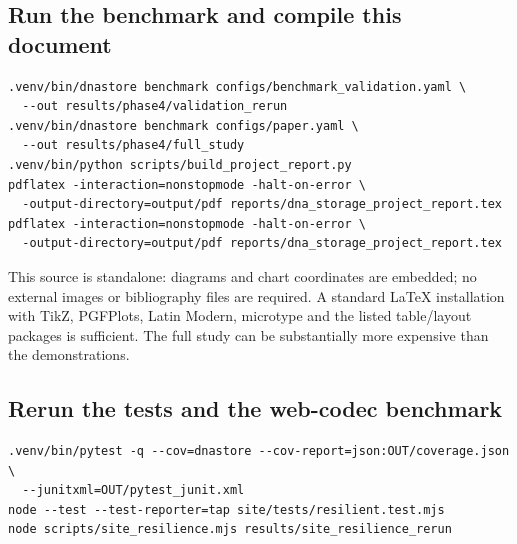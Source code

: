 \documentclass[11pt,a4paper]{article}
\begin{document}
\subsection*{Run the benchmark and compile this document}
\begin{lstlisting}
.venv/bin/dnastore benchmark configs/benchmark_validation.yaml \
  --out results/phase4/validation_rerun
.venv/bin/dnastore benchmark configs/paper.yaml \
  --out results/phase4/full_study
.venv/bin/python scripts/build_project_report.py
pdflatex -interaction=nonstopmode -halt-on-error \
  -output-directory=output/pdf reports/dna_storage_project_report.tex
pdflatex -interaction=nonstopmode -halt-on-error \
  -output-directory=output/pdf reports/dna_storage_project_report.tex
\end{lstlisting}
This source is standalone: diagrams and chart coordinates are embedded; no external
images or bibliography files are required. A standard LaTeX installation with TikZ,
PGFPlots, Latin Modern, microtype and the listed table/layout packages is sufficient.
The full study can be substantially more expensive than the demonstrations.

\subsection*{Rerun the tests and the web-codec benchmark}
\begin{lstlisting}
.venv/bin/pytest -q --cov=dnastore --cov-report=json:OUT/coverage.json \
  --junitxml=OUT/pytest_junit.xml
node --test --test-reporter=tap site/tests/resilient.test.mjs
node scripts/site_resilience.mjs results/site_resilience_rerun
\end{lstlisting}
\end{document}
